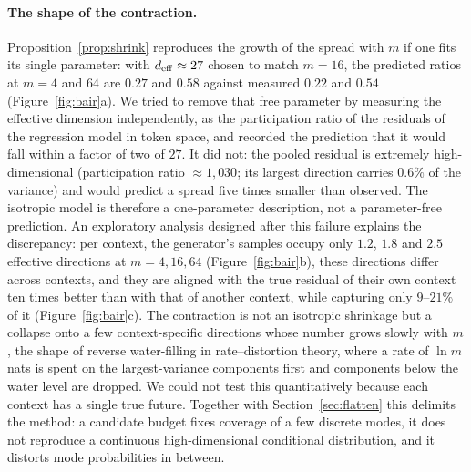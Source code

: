 \paragraph{The shape of the contraction.}
Proposition~\ref{prop:shrink} reproduces the growth of the spread with $m$ if one fits its single parameter: with $d_{\mathrm{eff}} \approx 27$ chosen to match $m{=}16$, the predicted ratios at $m = 4$ and $64$ are $0.27$ and $0.58$ against measured $0.22$ and $0.54$ (Figure~\ref{fig:bair}a). We tried to remove that free parameter by measuring the effective dimension independently, as the participation ratio of the residuals of the regression model in token space, and recorded the prediction that it would fall within a factor of two of $27$. It did not: the pooled residual is extremely high-dimensional (participation ratio $\approx 1{,}030$; its largest direction carries $0.6\%$ of the variance) and would predict a spread five times smaller than observed. The isotropic model is therefore a one-parameter description, not a parameter-free prediction. An exploratory analysis designed after this failure explains the discrepancy: per context, the generator's samples occupy only $1.2$, $1.8$ and $2.5$ effective directions at $m = 4, 16, 64$ (Figure~\ref{fig:bair}b), these directions differ across contexts, and they are aligned with the true residual of their own context ten times better than with that of another context, while capturing only $9$--$21\%$ of it (Figure~\ref{fig:bair}c). The contraction is not an isotropic shrinkage but a collapse onto a few context-specific directions whose number grows slowly with $m$, the shape of reverse water-filling in rate--distortion theory, where a rate of $\ln m$ nats is spent on the largest-variance components first and components below the water level are dropped. We could not test this quantitatively because each context has a single true future. Together with Section~\ref{sec:flatten} this delimits the method: a candidate budget fixes coverage of a few discrete modes, it does not reproduce a continuous high-dimensional conditional distribution, and it distorts mode probabilities in between.
